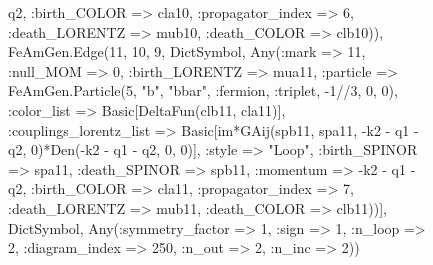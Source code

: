\documentclass{revtex4}
\begin{document}
\begin{figure}[!htb]
\begin{center}
{q2, :birth_COLOR => cla10, :propagator_index => 6, :death_LORENTZ => mub10, :death_COLOR => clb10)), FeAmGen.Edge(11, 10, 9, Dict{Symbol, Any}(:mark => 11, :null_MOM => 0, :birth_LORENTZ => mua11, :particle => FeAmGen.Particle(5, "b", "bbar", :fermion, :triplet, -1//3, 0, 0), :color_list => Basic[DeltaFun(clb11, cla11)], :couplings_lorentz_list => Basic[im*GAij(spb11, spa11, -k2 - q1 - q2, 0)*Den(-k2 - q1 - q2, 0, 0)], :style => "Loop", :birth_SPINOR => spa11, :death_SPINOR => spb11, :momentum => -k2 - q1 - q2, :birth_COLOR => cla11, :propagator_index => 7, :death_LORENTZ => mub11, :death_COLOR => clb11))], Dict{Symbol, Any}(:symmetry_factor => 1, :sign => 1, :n_loop => 2, :diagram_index => 250, :n_out => 2, :n_inc => 2)) 
}
\end{center}
\end{figure}
\end{document}
